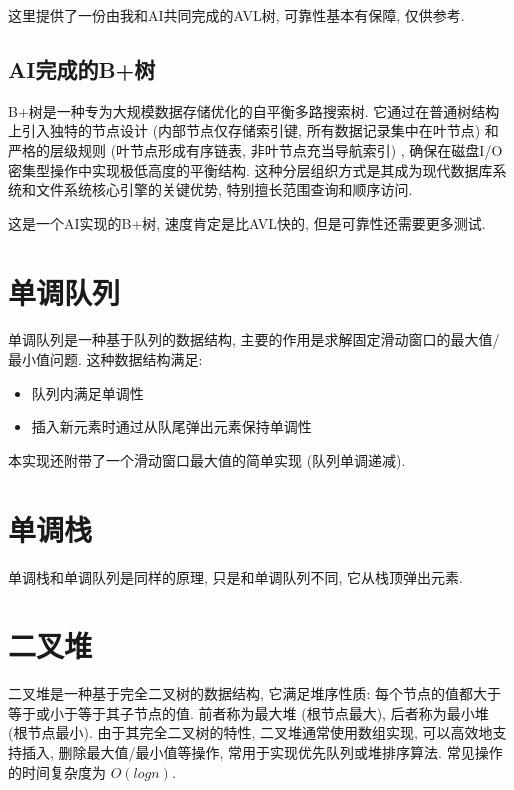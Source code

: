 \documentclass[a4paper]{ctexbook}
\begin{document}
这里提供了一份由我和AI共同完成的AVL树, 可靠性基本有保障, 仅供参考.



\subsection*{AI完成的B+树}

B+树是一种专为大规模数据存储优化的自平衡多路搜索树. 它通过在普通树结构上引入独特的节点设计 (内部节点仅存储索引键, 所有数据记录集中在叶节点) 和严格的层级规则 (叶节点形成有序链表, 非叶节点充当导航索引) , 确保在磁盘I/O密集型操作中实现极低高度的平衡结构. 这种分层组织方式是其成为现代数据库系统和文件系统核心引擎的关键优势, 特别擅长范围查询和顺序访问.

这是一个AI实现的B+树, 速度肯定是比AVL快的, 但是可靠性还需要更多测试.



\section{单调队列}
单调队列是一种基于队列的数据结构, 主要的作用是求解固定滑动窗口的最大值/最小值问题. 这种数据结构满足:
\begin{itemize}
	\item 队列内满足单调性
	\item 插入新元素时通过从队尾弹出元素保持单调性
\end{itemize}

本实现还附带了一个滑动窗口最大值的简单实现 (队列单调递减).



\section{单调栈}

单调栈和单调队列是同样的原理, 只是和单调队列不同, 它从栈顶弹出元素.



\section{二叉堆}

二叉堆是一种基于完全二叉树的数据结构, 它满足堆序性质: 每个节点的值都大于等于或小于等于其子节点的值. 前者称为最大堆 (根节点最大), 后者称为最小堆 (根节点最小). 由于其完全二叉树的特性, 二叉堆通常使用数组实现, 可以高效地支持插入, 删除最大值/最小值等操作, 常用于实现优先队列或堆排序算法. 常见操作的时间复杂度为 $O(log n)$.
\end{document}
